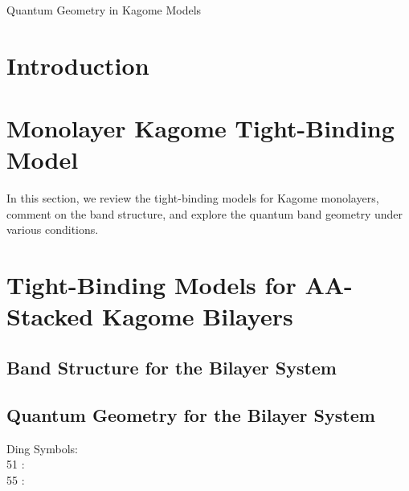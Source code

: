 \documentclass[12pt]{article} %
\author{Nabil Atlam}
\date{December 2024}
\renewcommand{\title}[1]{\vbox{\center\LARGE{#1}}\vspace{5mm}}
\begin{document}
\begin{titlepage}
    \hfill
    \title{Quantum Geometry in Kagome Models}

\end{titlepage}


\section{Introduction}



\section{Monolayer Kagome Tight-Binding Model}

In this section, we review the tight-binding models for Kagome monolayers, comment on the band 
structure, and explore the quantum band geometry under various conditions. 

\section{Tight-Binding Models for AA-Stacked Kagome Bilayers}

\subsection{Band Structure for the Bilayer System}

\subsection{Quantum Geometry for the Bilayer System}

\ifdefined\TESTPIFONT
    Ding Symbols: \\
    51 : \\
    55 : 
\fi
\end{document}
